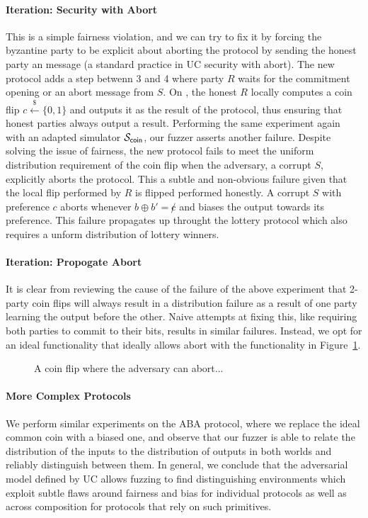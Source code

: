 \paragraph{Iteration: Security with Abort}
This is a simple fairness violation, and we can try to fix it by forcing the
byzantine party to be explicit about aborting the protocol by sending the
honest party an  message (a standard practice in UC security with
abort).  The new protocol adds a step betwenn 3 and 4 where party $R$ waits for
the commitment opening or an abort message from $S$.  On , the honest
$R$ locally computes a coin flip $c \xleftarrow{\$} \{0,1\}$ and outputs it as
the result of the protocol, thus ensuring that honest parties always output a
result.  Performing the same experiment again with an adapted simulator
$\mathcal{S}_{{\mathsf {coin}}}$, our fuzzer asserts another failure.  Despite solving the issue
of fairness, the new protocol fails to meet the uniform distribution
requirement of the coin flip when the adversary, a corrupt $S$, explicitly
aborts the protocol.  This a subtle and non-obvious failure given that the
local flip performed by $R$ is flipped performed honestly.  A corrupt $S$ with
preference $c$ aborts whenever $b \oplus b' = \not c$ and biases the output
towards its preference.  This failure propagates up throught the lottery
protocol which also requires a unform distribution of lottery winners. 

\paragraph{Iteration: Propogate Abort}
It is clear from reviewing the cause of the failure of the above experiment that 2-party coin flips will always result in a distribution failure as a result of one party learning the output before the other.
Naive attempts at fixing this, like requiring both parties to commit to their bits, results in similar failures.
Instead, we opt for an ideal functionality that ideally allows abort with the functionality in Figure~\ref{fig:fcoinabort}.

\begin{figure}
\centering

\caption{A coin flip where the adversary can abort...}
\label{fig:fcoinabort}
\end{figure}

\paragraph{More Complex Protocols}
We perform similar experiments on the ABA protocol, where we replace the ideal
common coin with a biased one, and observe that our fuzzer is able to relate
the distribution of the inputs to the distribution of outputs in both worlds
and reliably distinguish between them.  In general, we conclude that the
adversarial model defined by UC allows fuzzing to find distinguishing
environments which exploit subtle flaws around fairness and bias for individual
protocols as well as across composition for protocols that rely on such
primitives. 

